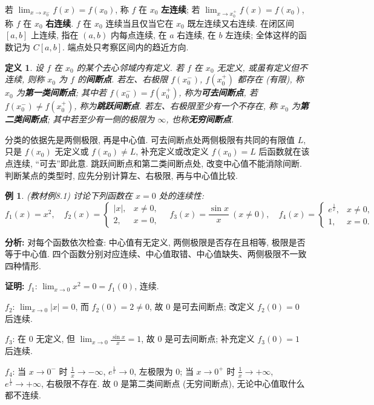 \documentclass[UTF8,openany]{ctexbook}
\theoremstyle{chinesetextbook}
\newtheorem{definition}{定义}[section]
\newtheorem{example}{例}[section]
\newenvironment{cnproof}{\par\indent\textbf{证明:} \ignorespaces}{\par}
\begin{document}
若 $\displaystyle\lim_{x\to x_0^-}f(x)=f(x_0)$, 称 $f$ 在 $x_0$ \textbf{左连续}; 若 $\displaystyle\lim_{x\to x_0^+}f(x)=f(x_0)$, 称 $f$ 在 $x_0$ \textbf{右连续}. $f$ 在 $x_0$ 连续当且仅当它在 $x_0$ 既左连续又右连续. 在闭区间 $[a,b]$ 上连续, 指在 $(a,b)$ 内每点连续, 在 $a$ 右连续, 在 $b$ 左连续; 全体这样的函数记为 $C[a,b]$. 端点处只考察区间内的趋近方向.
\begin{definition}
设 $f$ 在 $x_0$ 的某个去心邻域内有定义. 若 $f$ 在 $x_0$ 无定义, 或虽有定义但不连续, 则称 $x_0$ 为 $f$ 的\textbf{间断点}. 若左、右极限 $f(x_0^-)$, $f(x_0^+)$ 都存在 (有限), 称 $x_0$ 为\textbf{第一类间断点}; 其中若 $f(x_0^-)=f(x_0^+)$, 称为\textbf{可去间断点}, 若 $f(x_0^-)\ne f(x_0^+)$, 称为\textbf{跳跃间断点}. 若左、右极限至少有一个不存在, 称 $x_0$ 为\textbf{第二类间断点}; 其中若至少有一侧的极限为 $\infty$, 也称\textbf{无穷间断点}.
\end{definition}
分类的依据先是两侧极限, 再是中心值. 可去间断点处两侧极限有共同的有限值 $L$, 只是 $f(x_0)$ 无定义或 $f(x_0)\ne L$, 补充定义或改定义 $f(x_0)=L$ 后函数就在该点连续, “可去”即此意. 跳跃间断点和第二类间断点处, 改变中心值不能消除间断. 判断某点的类型时, 应先分别计算左、右极限, 再与中心值比较.
\begin{example}
\textnormal{(教材例8.1)} 讨论下列函数在 $x=0$ 处的连续性:
\[
f_1(x)=x^2,\quad
f_2(x)=\begin{cases}|x|,&x\ne0,\\2,&x=0,\end{cases}\quad
f_3(x)=\frac{\sin x}{x}\ (x\ne0),\quad
f_4(x)=\begin{cases}e^{\frac1x},&x\ne0,\\1,&x=0.\end{cases}
\]
\end{example}
\par\indent\textbf{分析:} 对每个函数依次检查: 中心值有无定义, 两侧极限是否存在且相等, 极限是否等于中心值. 四个函数分别对应连续、中心值取错、中心值缺失、两侧极限不一致四种情形.
\begin{cnproof}
$f_1$: $\displaystyle\lim_{x\to0}x^2=0=f_1(0)$, 连续.

$f_2$: $\displaystyle\lim_{x\to0}|x|=0$, 而 $f_2(0)=2\ne0$, 故 $0$ 是可去间断点; 改定义 $f_2(0)=0$ 后连续.

$f_3$: 在 $0$ 无定义, 但 $\displaystyle\lim_{x\to0}\frac{\sin x}x=1$, 故 $0$ 是可去间断点; 补充定义 $f_3(0)=1$ 后连续.

$f_4$: 当 $x\to0^-$ 时 $\displaystyle\frac1x\to-\infty$, $e^{\frac1x}\to0$, 左极限为 $0$; 当 $x\to0^+$ 时 $\displaystyle\frac1x\to+\infty$, $e^{\frac1x}\to+\infty$, 右极限不存在. 故 $0$ 是第二类间断点 (无穷间断点), 无论中心值取什么都不连续.
\end{cnproof}
\end{document}
